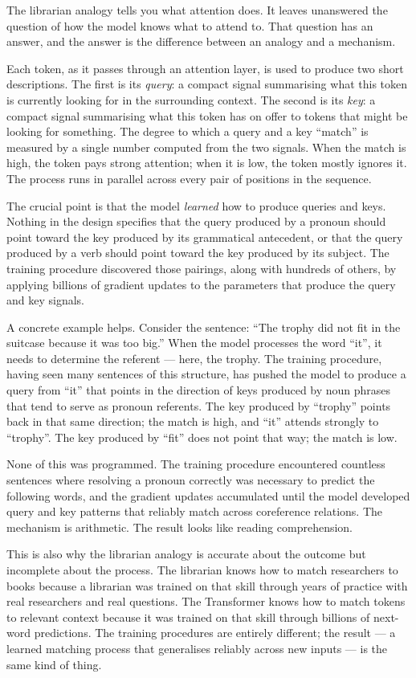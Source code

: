 The librarian analogy tells you what attention does. It leaves
unanswered the question of how the model knows what to attend to.
That question has an answer, and the answer is the difference
between an analogy and a mechanism.

Each token, as it passes through an attention layer, is used to
produce two short descriptions. The first is its \emph{query}: a
compact signal summarising what this token is currently looking for
in the surrounding context. The second is its \emph{key}: a compact
signal summarising what this token has on offer to tokens that
might be looking for something. The degree to which a query and a
key ``match'' is measured by a single number computed from the two
signals. When the match is high, the token pays strong attention;
when it is low, the token mostly ignores it. The process runs in
parallel across every pair of positions in the sequence.

The crucial point is that the model \emph{learned} how to produce
queries and keys. Nothing in the design specifies that the query
produced by a pronoun should point toward the key produced by its
grammatical antecedent, or that the query produced by a verb
should point toward the key produced by its subject. The training
procedure discovered those pairings, along with hundreds of others,
by applying billions of gradient updates to the parameters that
produce the query and key signals.

A concrete example helps. Consider the sentence: ``The trophy did
not fit in the suitcase because it was too big.'' When the model
processes the word ``it'', it needs to determine the referent ---
here, the trophy. The training procedure, having seen many
sentences of this structure, has pushed the model to produce a
query from ``it'' that points in the direction of keys produced by
noun phrases that tend to serve as pronoun referents. The key
produced by ``trophy'' points back in that same direction; the
match is high, and ``it'' attends strongly to ``trophy''. The key
produced by ``fit'' does not point that way; the match is low.

None of this was programmed. The training procedure encountered
countless sentences where resolving a pronoun correctly was
necessary to predict the following words, and the gradient updates
accumulated until the model developed query and key patterns that
reliably match across coreference relations. The mechanism is
arithmetic. The result looks like reading comprehension.

This is also why the librarian analogy is accurate about the
outcome but incomplete about the process. The librarian knows how
to match researchers to books because a librarian was trained on
that skill through years of practice with real researchers and
real questions. The Transformer knows how to match tokens to
relevant context because it was trained on that skill through
billions of next-word predictions. The training procedures are
entirely different; the result --- a learned matching process that
generalises reliably across new inputs --- is the same kind of
thing.

